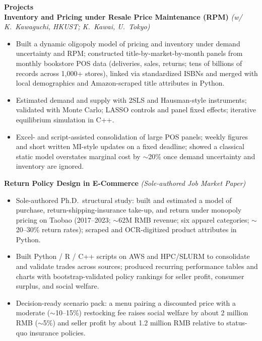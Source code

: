 \documentclass[11pt,letterpaper]{article}
\begin{document}
{\large \textbf{Projects}}\\[-0.5pt]
\textbf{Inventory and Pricing under Resale Price Maintenance (RPM)} \textit{(w/ K.\ Kawaguchi, HKUST; K.\ Kawai, U.\ Tokyo)}\\
\vspace{-6pt}
\begin{itemize}
  \item Built a dynamic oligopoly model of pricing and inventory under demand uncertainty and RPM; constructed title-by-market-by-month panels from monthly bookstore POS data (deliveries, sales, returns; tens of billions of records across 1{,}000+ stores), linked via standardized ISBNs and merged with local demographics and Amazon-scraped title attributes in Python.
  \item Estimated demand and supply with 2SLS and Hausman-style instruments; validated with Monte Carlo; LASSO controls and panel fixed effects; iterative equilibrium simulation in C++.
  \item Excel- and script-assisted consolidation of large POS panels; weekly figures and short written MI-style updates on a fixed deadline; showed a classical static model overstates marginal cost by \(\sim\)20\% once demand uncertainty and inventory are ignored.
\end{itemize}
\vspace{-3pt}
\textbf{Return Policy Design in E-Commerce} \textit{(Sole-authored Job Market Paper)}\\
\vspace{-6pt}
\begin{itemize}
  \item Sole-authored Ph.D.\ structural study: built and estimated a model of purchase, return-shipping-insurance take-up, and return under monopoly pricing on Taobao (2017--2023; \(\sim\)62M RMB revenue; six apparel categories; \(\sim\)20--30\% return rates); scraped and OCR-digitized product attributes in Python.
  \item Built Python / R / C++ scripts on AWS and HPC/SLURM to consolidate and validate trades across sources; produced recurring performance tables and charts with bootstrap-validated policy rankings for seller profit, consumer surplus, and social welfare.
  \item Decision-ready scenario pack: a menu pairing a discounted price with a moderate (\(\sim\)10--15\%) restocking fee raises social welfare by about 2 million RMB (\(\sim\)5\%) and seller profit by about 1.2 million RMB relative to status-quo insurance policies.
\end{itemize}
\end{document}
